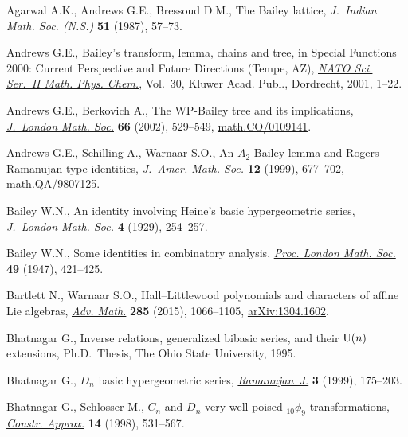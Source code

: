 \documentclass[pdftex]{sigma}
\numberwithin{equation}{section}
\begin{document}
\begin{thebibliography}{99}
\footnotesize\itemsep=0pt

Agarwal A.K., Andrews G.E., Bressoud D.M., The {B}ailey lattice,
 \textit{J.~Indian Math. Soc. (N.S.)} \textbf{51} (1987), 57--73.

Andrews G.E., Bailey's transform, lemma, chains and tree, in Special Functions
 2000: Current Perspective and Future Directions ({T}empe, {AZ}), \href{https://doi.org/10.1007/978-94-010-0818-1_1}{\textit{NATO
 Sci. Ser.~II Math. Phys. Chem.}}, Vol.~30, Kluwer Acad. Publ., Dordrecht,
 2001, 1--22.

Andrews G.E., Berkovich A., The {WP}-{B}ailey tree and its implications,
 \href{https://doi.org/10.1112/S0024610702003617}{\textit{J.~London Math. Soc.}} \textbf{66} (2002), 529--549,
 \href{https://arxiv.org/abs/math.CO/0109141}{math.CO/0109141}.

Andrews G.E., Schilling A., Warnaar S.O.,
 An {$A_2$} {B}ailey lemma and {R}ogers--{R}amanujan-type identities, \href{https://doi.org/10.1090/S0894-0347-99-00297-0}{\textit{J.~Amer. Math. Soc.}} \textbf{12} (1999), 677--702, \href{https://arxiv.org/abs/math.QA/9807125}{math.QA/9807125}.

Bailey W.N., An identity involving {H}eine's basic hypergeometric series,
 \href{https://doi.org/10.1112/jlms/s1-4.4.254}{\textit{J.~London Math. Soc.}} \textbf{4} (1929), 254--257.

Bailey W.N., Some identities in combinatory analysis, \href{https://doi.org/10.1112/plms/s2-49.6.421}{\textit{Proc. London
 Math. Soc.}} \textbf{49} (1947), 421--425.

Bartlett N., Warnaar S.O., Hall--{L}ittlewood polynomials and characters of
 affine {L}ie algebras, \href{https://doi.org/10.1016/j.aim.2015.08.011}{\textit{Adv. Math.}} \textbf{285} (2015), 1066--1105,
 \href{https://arxiv.org/abs/1304.1602}{arXiv:1304.1602}.

Bhatnagar G., Inverse relations, generalized bibasic series, and their {${\rm
 U}(n)$} extensions, Ph.D.~Thesis, The Ohio State University, 1995.

Bhatnagar G., {$D_n$} basic hypergeometric series, \href{https://doi.org/10.1023/A:1006997424561}{\textit{Ramanujan~J.}}
 \textbf{3} (1999), 175--203.

Bhatnagar G., Schlosser M., {$C_n$} and {$D_n$} very-well-poised
 {${}_{10}\phi_9$} transformations, \href{https://doi.org/10.1007/s003659900089}{\textit{Constr. Approx.}} \textbf{14}
 (1998), 531--567.


\end{thebibliography}
\end{document}
